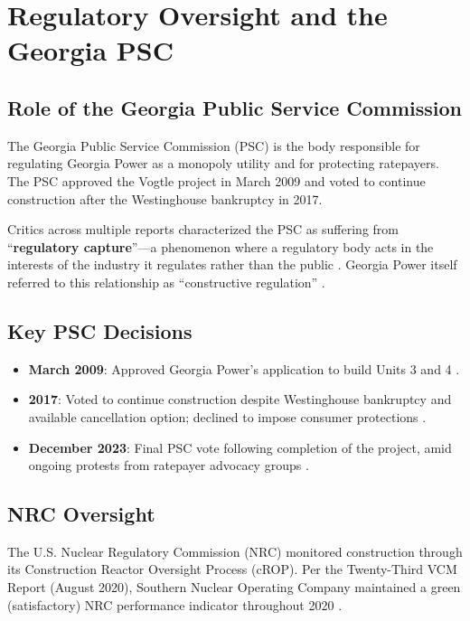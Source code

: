 \documentclass[12pt,a4paper]{article}
\begin{document}
\section{Regulatory Oversight and the Georgia PSC}

\subsection{Role of the Georgia Public Service Commission}

The Georgia Public Service Commission (PSC) is the body responsible for regulating
Georgia Power as a monopoly utility and for protecting ratepayers. The PSC approved
the Vogtle project in March 2009 and voted to continue construction after the
Westinghouse bankruptcy in 2017.

Critics across multiple reports characterized the PSC as suffering from
``\textbf{regulatory capture}''---a phenomenon where a regulatory body acts in the
interests of the industry it regulates rather than the public \cite{gcv_ratepayer,durand_truth}. Georgia Power itself
referred to this relationship as ``constructive regulation'' \cite{gcv_ratepayer}.

\subsection{Key PSC Decisions}

\begin{itemize}
    \item \textbf{March 2009}: Approved Georgia Power's application to build Units 3 and 4 \cite{gpsc_2008,schlissel_ieefa}.
    \item \textbf{2017}: Voted to continue construction despite Westinghouse bankruptcy and
          available cancellation option; declined to impose consumer protections \cite{gcv_ratepayer,durand_truth}.
    \item \textbf{December 2023}: Final PSC vote following completion of the project, amid
          ongoing protests from ratepayer advocacy groups \cite{durand_truth}.
\end{itemize}

\subsection{NRC Oversight}

The U.S. Nuclear Regulatory Commission (NRC) monitored construction through its
Construction Reactor Oversight Process (cROP). Per the Twenty-Third VCM Report
(August 2020), Southern Nuclear Operating Company maintained a green (satisfactory)
NRC performance indicator throughout 2020 \cite{vcm_report}.
\end{document}
